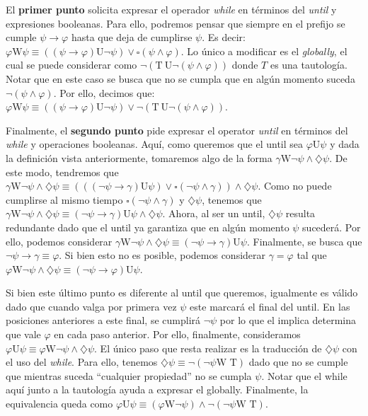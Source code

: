 \documentclass{article}
\begin{document}
El \textbf{primer punto} solicita expresar el operador \textit{while} en términos del \textit{until} y expresiones booleanas.
Para ello, podremos pensar que siempre en el prefijo se cumple $\psi \to \varphi$ hasta que deja de cumplirse $\psi$.
Es decir: $\varphi \text{W} \psi \equiv ((\psi \to \varphi) \text{U} \neg\psi) \lor \square(\psi \land \varphi)$.
Lo único a modificar es el \textit{globally}, el cual se puede considerar como $\neg (\text{T}\ \text{U} \neg (\psi \land \varphi))$ donde $T$ es una tautología.
Notar que en este caso se busca que no se cumpla que en algún momento suceda $\neg (\psi \land \varphi)$.
Por ello, decimos que: $\varphi \text{W} \psi \equiv ((\psi \to \varphi) \text{U} \neg\psi) \lor \neg(\text{T}\ \text{U} \neg(\psi \land \varphi))$.

Finalmente, el \textbf{segundo punto} pide expresar el operator \textit{until} en términos del \textit{while} y operaciones booleanas.
Aquí, como queremos que el until sea $\varphi \text{U} \psi$ y dada la definición vista anteriormente, tomaremos algo de la forma $\gamma \text{W} \neg\psi \land \diamondsuit\psi$.
De este modo, tendremos que $\gamma \text{W} \neg\psi \land \diamondsuit\psi \equiv (((\neg\psi \to \gamma) \text{U} \psi) \lor \square(\neg\psi \land \gamma)) \land \diamondsuit\psi$.
Como no puede cumplirse al mismo tiempo $\square(\neg\psi \land \gamma)$ y $\diamondsuit\psi$, tenemos que $\gamma \text{W} \neg\psi \land \diamondsuit\psi \equiv (\neg\psi \to \gamma) \text{U} \psi \land \diamondsuit\psi$.
Ahora, al ser un until, $\diamondsuit\psi$ resulta redundante dado que el until ya garantiza que en algún momento $\psi$ sucederá.
Por ello, podemos considerar $\gamma \text{W} \neg\psi \land \diamondsuit\psi \equiv (\neg\psi \to \gamma) \text{U} \psi$.
Finalmente, se busca que $\neg\psi \to \gamma \equiv \varphi$.
Si bien esto no es posible, podemos considerar $\gamma = \varphi$ tal que $\varphi \text{W} \neg\psi \land \diamondsuit\psi \equiv (\neg\psi \to \varphi) \text{U} \psi$.

Si bien este último punto es diferente al until que queremos, igualmente es válido dado que cuando valga por primera vez $\psi$ este marcará el final del until.
En las posiciones anteriores a este final, se cumplirá $\neg\psi$ por lo que el implica determina que vale $\varphi$ en cada paso anterior.
Por ello, finalmente, consideramos $\varphi \text{U} \psi \equiv \varphi \text{W} \neg\psi \land \diamondsuit\psi$.
El único paso que resta realizar es la traducción de $\diamondsuit\psi$ con el uso del \textit{while}.
Para ello, tenemos $\diamondsuit\psi \equiv \neg(\neg\psi \text{W T})$ dado que no se cumple que mientras suceda ``cualquier propiedad'' no se cumpla $\psi$.
Notar que el while aquí junto a la tautología ayuda a expresar el globally.
Finalmente, la equivalencia queda como $\varphi \text{U} \psi \equiv (\varphi \text{W} \neg\psi) \land \neg(\neg\psi \text{W T})$.
\end{document}
